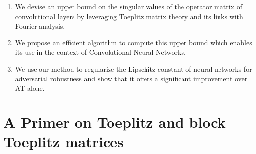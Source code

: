 \begin{enumerate}
  \item We devise an upper bound on the singular values of the operator matrix of convolutional layers by leveraging Toeplitz matrix theory and its links with Fourier analysis.
  \item We propose an efficient algorithm to compute this upper bound which enables its use in the context of Convolutional Neural Networks.
  \item We use our method to regularize the Lipschitz constant of neural networks for adversarial robustness and show that it offers a significant improvement over AT alone.
\end{enumerate}


\section{A Primer on Toeplitz and block Toeplitz matrices}
\label{section:primer_toeplitz_matrix}

